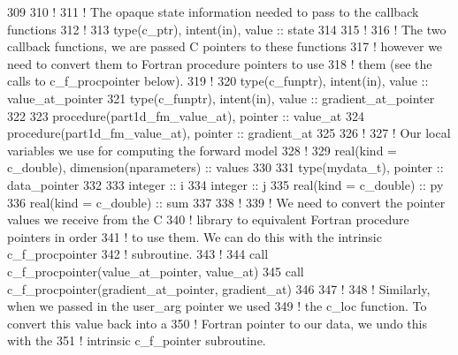 \begin{DoxyCodeInclude}
309   
310   \textcolor{comment}{!}
311   \textcolor{comment}{! The opaque state information needed to pass to the callback functions}
312   \textcolor{comment}{!}
313   \textcolor{keywordtype}{type}(c\_ptr), \textcolor{keywordtype}{intent(in)}, \textcolor{keywordtype}{value} :: state
314   
315   \textcolor{comment}{!}
316   \textcolor{comment}{! The two callback functions, we are passed C pointers to these functions}
317   \textcolor{comment}{! however we need to convert them to Fortran procedure pointers to use}
318   \textcolor{comment}{! them (see the calls to c\_f\_procpointer below).}
319   \textcolor{comment}{!}
320   \textcolor{keywordtype}{type}(c\_funptr), \textcolor{keywordtype}{intent(in)}, \textcolor{keywordtype}{value} :: value\_at\_pointer
321   \textcolor{keywordtype}{type}(c\_funptr), \textcolor{keywordtype}{intent(in)}, \textcolor{keywordtype}{value} :: gradient\_at\_pointer
322 
323   \textcolor{keywordtype}{procedure}(part1d\_fm\_value\_at), \textcolor{keywordtype}{pointer} :: value\_at
324   \textcolor{keywordtype}{procedure}(part1d\_fm\_value\_at), \textcolor{keywordtype}{pointer} :: gradient\_at
325 
326   \textcolor{comment}{!}
327   \textcolor{comment}{! Our local variables we use for computing the forward model}
328   \textcolor{comment}{!}
329   \textcolor{keywordtype}{real(kind = c\_double)}, \textcolor{keywordtype}{dimension(nparameters)} :: values
330 
331   \textcolor{keywordtype}{type}(mydata\_t), \textcolor{keywordtype}{pointer} :: data\_pointer
332 
333   \textcolor{keywordtype}{integer} :: i
334   \textcolor{keywordtype}{integer} :: j
335   \textcolor{keywordtype}{real(kind = c\_double)} :: py
336   \textcolor{keywordtype}{real(kind = c\_double)} :: sum
337 
338   \textcolor{comment}{!}
339   \textcolor{comment}{! We need to convert the pointer values we receive from the C}
340   \textcolor{comment}{! library to equivalent Fortran procedure pointers in order}
341   \textcolor{comment}{! to use them. We can do this with the intrinsic c\_f\_procpointer}
342   \textcolor{comment}{! subroutine.}
343   \textcolor{comment}{!}
344   \textcolor{keyword}{call }c\_f\_procpointer(value\_at\_pointer, value\_at)
345   \textcolor{keyword}{call }c\_f\_procpointer(gradient\_at\_pointer, gradient\_at)
346 
347   \textcolor{comment}{!}
348   \textcolor{comment}{! Similarly, when we passed in the user\_arg pointer we used}
349   \textcolor{comment}{! the c\_loc function. To convert this value back into a}
350   \textcolor{comment}{! Fortran pointer to our data, we undo this with the }
351   \textcolor{comment}{! intrinsic c\_f\_pointer subroutine.}

\end{DoxyCodeInclude}
